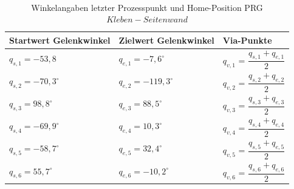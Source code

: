 \\
\begin{table}
\centering
\begin{tabular}{|l|l|l|}
	\hline
	Startwert Gelenkwinkel&  Zielwert Gelenkwinkel&  Via-Punkte\\
	\hline
	$q_{s,1} = -53,8$&  $q_{e,1} = -7,6^{\circ}$  &$q_{v,1}$ = $\dfrac{q_{s,1}+q_{e,1}}{2}$  \\
	\hline
	$q_{s,2} = -70,3^{\circ}$&  $q_{e,2} = -119,3^{\circ}$    &$q_{v,2}$ = $\dfrac{q_{s,2}+q_{e,2}}{2}$  \\
	\hline
	$q_{s,3} = 98,8^{\circ}$&  $q_{e,3} = 88,5^{\circ}$&$q_{v,3}$ = $\dfrac{q_{s,3}+q_{e,3}}{2}$  \\
	\hline
	$q_{s,4} = -69,9^{\circ}$&  $q_{e,4} = 10,3^{\circ}$&$q_{v,4}$ = $\dfrac{q_{s,4}+q_{e,4}}{2}$  \\
	\hline
	$q_{s,5} = -58,7^{\circ}$&  $q_{e,5} = 32,4^{\circ}$  &$q_{v,5}$ = $\dfrac{q_{s,5}+q_{e,5}}{2}$  \\
	\hline
	$q_{s,6} = 55,7^{\circ}$&  $q_{e,6} = -10,2^{\circ}$&$q_{v,6}$ = $\dfrac{q_{s,6}+q_{e,6}}{2}$  \\
	\hline
\end{tabular}
\caption{Winkelangaben letzter Prozesspunkt und Home-Position PRG $Kleben-Seitenwand$}
\label{tab:simu}
\end{table}
\\

